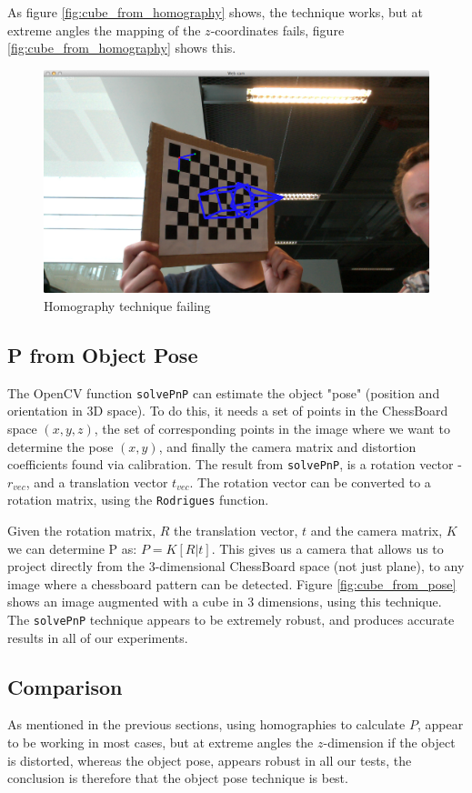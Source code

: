 \documentclass[a4paper,11pt]{article}
\begin{document}
As figure \ref{fig:cube_from_homography} shows, the technique works, but at extreme angles the mapping of the $z$-coordinates fails, figure \ref{fig:cube_from_homography} shows this.\\


\begin{figure}[H]
\centering
\includegraphics[width=0.8\linewidth]{cube_from_homography_fail}
\caption{Homography technique failing}
\label{fig:cube_from_homography_fail}
\end{figure}
\subsection{P from Object Pose}
The OpenCV function \texttt{solvePnP} can estimate the object "pose" (position and orientation in 3D space). To do this, it needs a set of points in the ChessBoard space $(x, y, z)$, the set of corresponding points in the image where we want to determine the pose $(x, y)$, and finally the camera matrix and distortion coefficients found via calibration. The result from \texttt{solvePnP}, is a rotation vector - $r_{vec}$, and a translation vector $t_{vec}$. The rotation vector can be converted to a rotation matrix, using the \texttt{Rodrigues} function.

Given the rotation matrix, $R$ the translation vector, $t$ and the camera matrix, $K$ we can determine P as: $P=K[R|t]$. This gives us a camera that allows us to project directly from the 3-dimensional ChessBoard space (not just plane), to any image where a chessboard pattern can be detected. Figure \ref{fig:cube_from_pose} shows an image augmented with a cube in 3 dimensions, using this technique.
The \texttt{solvePnP} technique appears to be extremely robust, and produces accurate results in all of our experiments.

\subsection{Comparison}
As mentioned in the previous sections, using homographies to calculate $P$, appear to be working in most cases, but at extreme angles the $z$-dimension if the object is distorted, whereas the object pose, appears robust in all our tests, the conclusion is therefore that the object pose technique is best.
\end{document}
